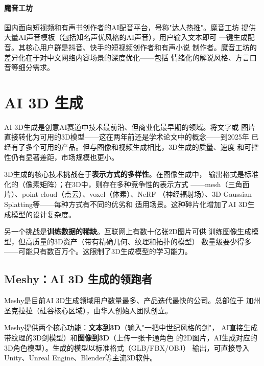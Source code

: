 \paragraph{魔音工坊}
国内面向短视频和有声书创作者的AI配音平台，号称"达人热推"。魔音工坊
提供大量AI声音模板（包括知名声优风格的AI声音），用户输入文本即可
一键生成配音。其核心用户群是抖音、快手的短视频创作者和有声小说
制作者。魔音工坊的差异化在于对中文网络内容场景的深度优化——包括
情绪化的解说风格、方言口音等细分需求。



\section{AI 3D 生成}
\label{sec:create-3d}

AI 3D生成是创意AI赛道中技术最前沿、但商业化最早期的领域。将文字或
图片直接转化为可用的3D模型——这在两年前还是学术论文中的概念——到2025年
已经有了多个可用的产品。但与图像和视频生成相比，3D生成的质量、速度
和可控性仍有显著差距，市场规模也更小。

3D生成的核心技术挑战在于\textbf{表示方式的多样性}。在图像生成中，
输出格式是标准化的（像素矩阵）；在3D中，则存在多种竞争性的表示方式
——mesh（三角面片）、point cloud（点云）、voxel（体素）、NeRF
（神经辐射场）、3D Gaussian Splatting等——每种方式有不同的优劣和
适用场景。这种碎片化增加了AI 3D生成模型的设计复杂度。

另一个挑战是\textbf{训练数据的稀缺}。互联网上有数十亿张2D图片可供
训练图像生成模型，但高质量的3D资产（带有精确几何、纹理和拓扑的模型）
数量级要少得多——可能只有数百万个。这限制了3D生成模型的学习能力。

\subsection{Meshy：AI 3D 生成的领跑者}
\label{subsec:meshy}

Meshy是目前AI 3D生成领域用户数量最多、产品迭代最快的公司。总部位于
加州圣克拉拉（硅谷核心区域），由华人创始人团队创立。

Meshy提供两个核心功能：\textbf{文本到3D}（输入"一把中世纪风格的剑"，
AI直接生成带纹理的3D剑模型）和\textbf{图像到3D}（上传一张卡通角色
的2D图片，AI生成对应的3D角色模型）。生成的模型以标准格式（GLB/FBX/OBJ）
输出，可直接导入Unity、Unreal Engine、Blender等主流3D软件。

